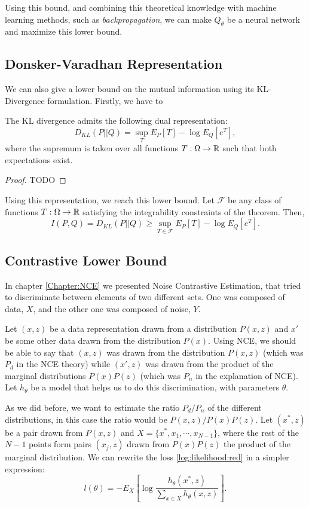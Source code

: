 Using this bound, and combining this theoretical knowledge with machine learning methods, such as \emph{backpropagation}, we can make $Q_\theta$ be a neural network and maximize this lower bound.

\subsection{Donsker-Varadhan Representation}

We can also give a lower bound on the mutual information using its KL-Divergence formulation. Firstly, we have to 

\begin{nth}
The KL divergence admits the following dual representation:
\[
D_{KL}(P || Q) = \sup_{T} E_P[T] - \log E_Q[e^T],
\]
where the supremum is taken over all functions $T:\Omega \to \mathbb{R}$ such that both expectations exist.
\end{nth}
\begin{proof}
    TODO
\end{proof}

Using this representation, we reach this lower bound. Let $\mathcal F$ be any class of functions $T: \Omega \to \mathbb{R}$ satisfying the integrability constraints of the theorem. Then, 
$$
I(P,Q) = D_{KL}(P||Q) \geq \sup_{T \in \mathcal F} E_P[T] - \log E_Q[e^T].
$$

\subsection{Contrastive Lower Bound}

In chapter \ref{Chapter:NCE} we presented Noise Contrastive Estimation, that tried to discriminate between elements of two different sets. One was composed of data, $X$, and the other one was composed of noise, $Y$.

Let $(x,z)$ be a data representation drawn from a distribution $P(x,z)$ and $x'$ be some other data drawn from the distribution $P(x)$. Using NCE, we should be able to say that $(x,z)$ was drawn from the distribution $P(x,z)$ (which was $P_d$ in the NCE theory) while $(x',z)$ was drawn from the product of the marginal distributions $P(x)P(z)$ (which was $P_n$ in the explanation of NCE). Let $h_\theta$ be a model that helps us to do this discrimination, with parameters $\theta$. 

As we did before, we want to estimate the ratio $P_d/P_n$ of the different distributions, in this case the ratio would be $P(x,z)/P(x)P(z)$. Let $(x^*,z)$ be a pair drawn from $P(x,z)$ and $X = \{x^*, x_1,\cdots,x_{N-1} \}$, where the rest of the $N-1$ points form pairs $(x_j,z)$ drawn from $P(x)P(z)$ the product of the marginal distribution. We can rewrite the loss \ref{log:likelihood:red} in a simpler expression:
\begin{equation}\label{log:likelihood:rewritten}
l(\theta) = - E_X \left[ \log \frac{h_\theta(x^*,z)}{\sum_{x \in X}h_\theta(x,z)}\right]  .
\end{equation}

